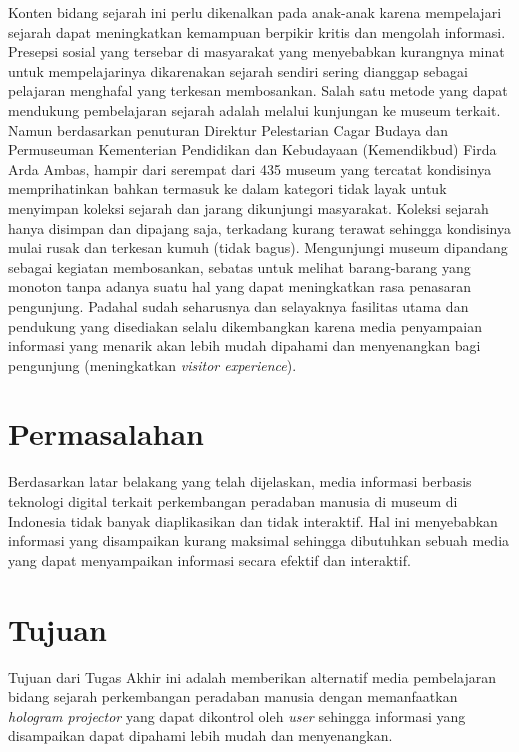 	Konten bidang sejarah ini perlu dikenalkan pada anak-anak karena mempelajari sejarah dapat meningkatkan kemampuan berpikir kritis dan mengolah informasi. Presepsi sosial yang tersebar di masyarakat yang menyebabkan kurangnya minat untuk mempelajarinya dikarenakan sejarah sendiri sering dianggap sebagai pelajaran menghafal yang terkesan membosankan\cite{wirawan_2018}. Salah satu metode yang dapat mendukung pembelajaran sejarah adalah melalui kunjungan ke museum terkait. Namun berdasarkan penuturan Direktur Pelestarian Cagar Budaya dan Permuseuman Kementerian Pendidikan dan Kebudayaan (Kemendikbud) Firda Arda Ambas, hampir dari serempat dari 435 museum yang tercatat kondisinya memprihatinkan bahkan termasuk ke dalam kategori tidak layak untuk menyimpan koleksi sejarah dan jarang dikunjungi masyarakat\cite{kemendikbud_2019}. Koleksi sejarah hanya disimpan dan dipajang saja, terkadang kurang terawat sehingga kondisinya mulai rusak dan terkesan kumuh (tidak bagus). Mengunjungi museum dipandang sebagai kegiatan membosankan, sebatas untuk melihat barang-barang yang monoton tanpa adanya suatu hal yang dapat meningkatkan rasa penasaran pengunjung. Padahal sudah seharusnya dan selayaknya fasilitas utama dan pendukung yang disediakan selalu dikembangkan karena media penyampaian informasi yang menarik akan lebih mudah dipahami dan menyenangkan bagi pengunjung (meningkatkan \textit{visitor experience})\cite{sheng2012study}. 
\vspace{2ex} 
 
\section{Permasalahan}
\vspace{1ex}
	Berdasarkan latar belakang yang telah dijelaskan, media informasi berbasis teknologi digital terkait perkembangan peradaban manusia di museum di Indonesia tidak banyak diaplikasikan dan tidak interaktif. Hal ini menyebabkan informasi yang disampaikan kurang maksimal sehingga dibutuhkan sebuah media yang dapat menyampaikan informasi secara efektif dan interaktif.
\vspace{2ex}

\section{Tujuan}
\vspace{1ex}
	Tujuan dari Tugas Akhir ini adalah memberikan alternatif media pembelajaran bidang sejarah perkembangan peradaban manusia dengan memanfaatkan \textit{hologram projector} yang dapat dikontrol oleh \textit{user} sehingga informasi yang disampaikan dapat dipahami lebih mudah dan menyenangkan.
\vspace{2ex}

